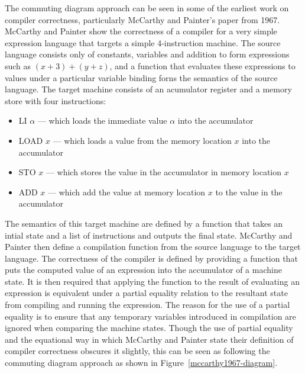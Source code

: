\documentclass[a4paper,12pt]{article}
\begin{document}
The commuting diagram approach can be seen in some of the earliest work on
compiler correctness, particularly McCarthy and Painter's paper from
1967\cite{mccarthy1967}.  McCarthy and Painter show the correctness of a
compiler for a very simple expression language that targets a simple
4-instruction machine.  The source language consists only of constants,
variables and addition to form expressions such as $(x + 3) + (y + z)$, and a
function that evaluates these expressions to values under a particular variable
binding forns the semantics of the source language.  The target machine consists
of an acumulator register and a memory store with four instructions:
\begin{itemize}
\item LI $\alpha$ --- which loads the immediate value $\alpha$ into the
  accumulator
  \item LOAD $x$ --- which loads a value from the memory location $x$ into the
    accumulator
  \item STO $x$ --- which stores the value in the accumulator in memory location
    $x$
  \item ADD $x$ --- which add the value at memory location $x$ to the value in
    the accumulator
\end{itemize}
The semantics of this target machine are defined by a function that takes an
intial state and a list of instructions and outputs the final state.  McCarthy
and Painter then define a compilation function from the source language to the
target language.  The correctness of the compiler is defined by providing a
function that puts the computed value of an expression into the accumulator of a
machine state.  It is then required that applying the function to the result of
evaluating an expression is equivalent under a partial equality relation to the
resultant state from compiling and running the expression.  The reason for the
use of a partial equality is to ensure that any temporary variables introduced
in compilation are ignored when comparing the machine states.  Though the use of
partial equality and the equational way in which McCarthy and Painter state
their definition of compiler correctness obscures it slightly, this can be seen
as following the commuting diagram approach as shown in
Figure~\ref{mccarthy1967-diagram}.
\end{document}
